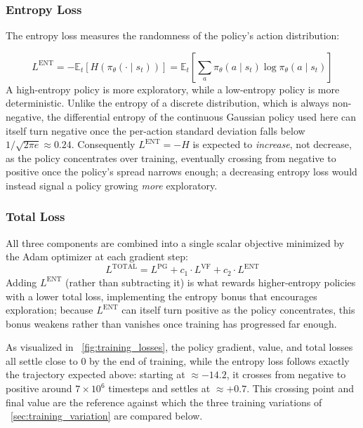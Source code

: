\subsubsection{Entropy Loss}
The entropy loss measures the randomness of the policy's action distribution:

\begin{equation}
    L^{\mathrm{ENT}} = -\mathbb{E}_t \left[ H\!\left(\pi_\theta(\cdot \mid s_t)\right) \right] = \mathbb{E}_t \left[ \sum_a \pi_\theta(a \mid s_t) \log \pi_\theta(a \mid s_t) \right]
\end{equation}
A high-entropy policy is more exploratory, while a low-entropy policy is more deterministic. Unlike the entropy of a discrete distribution, which is always non-negative, the differential entropy of the continuous Gaussian policy used here can itself turn negative once the per-action standard deviation falls below $1/\sqrt{2\pi e} \approx 0.24$. Consequently $L^{\mathrm{ENT}} = -H$ is expected to \emph{increase}, not decrease, as the policy concentrates over training, eventually crossing from negative to positive once the policy's spread narrows enough; a decreasing entropy loss would instead signal a policy growing \emph{more} exploratory.

\subsubsection{Total Loss}

All three components are combined into a single scalar objective minimized by the Adam optimizer at each gradient step:
\begin{equation}
    L^{\mathrm{TOTAL}} = L^{\mathrm{PG}} + c_1 \cdot L^{\mathrm{VF}} + c_2 \cdot L^{\mathrm{ENT}}
\end{equation}
Adding $L^{\mathrm{ENT}}$ (rather than subtracting it) is what rewards higher-entropy policies with a lower total loss, implementing the entropy bonus that encourages exploration; because $L^{\mathrm{ENT}}$ can itself turn positive as the policy concentrates, this bonus weakens rather than vanishes once training has progressed far enough.

As visualized in \figurename~\ref{fig:training_losses}, the policy gradient, value, and total losses all settle close to $0$ by the end of training, while the entropy loss follows exactly the trajectory expected above: starting at $\approx -14.2$, it crosses from negative to positive around $7\times10^6$ timesteps and settles at $\approx +0.7$. This crossing point and final value are the reference against which the three training variations of \sectionname~\ref{sec:training_variation} are compared below.

